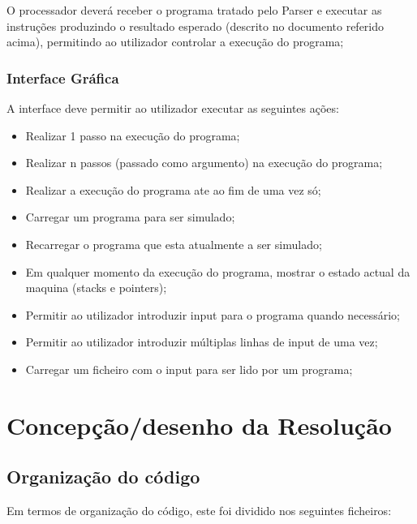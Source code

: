 \documentclass{report}
\begin{document}
\quad O processador deverá receber o programa tratado pelo Parser e executar as instruções produzindo o resultado
esperado (descrito no documento referido acima), permitindo ao utilizador controlar a execução do programa;

\subsection{Interface Gráfica}
\quad A interface deve permitir ao utilizador executar as seguintes ações:
\begin{itemize}
\item Realizar 1 passo na execução do programa;
\item Realizar n passos (passado como argumento) na execução do programa;
\item Realizar a execução do programa ate ao fim de uma vez só;
\item Carregar um programa para ser simulado;
\item Recarregar o programa que esta atualmente a ser simulado;
\item Em qualquer momento da execução do programa, mostrar o estado actual da maquina (stacks e pointers);
\item Permitir ao utilizador introduzir input para o programa quando necessário;
\item Permitir ao utilizador introduzir múltiplas linhas de input de uma vez;
\item Carregar um ficheiro com o input para ser lido por um programa;
\end{itemize}

\chapter{Concepção/desenho da Resolução}
\section{Organização do código}

Em termos de organização do código, este foi dividido nos seguintes ficheiros:
\end{document}

